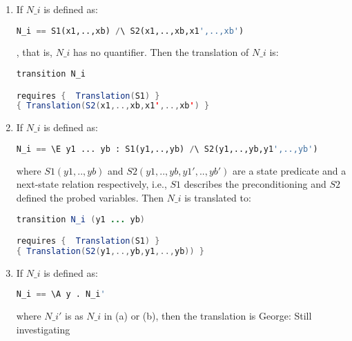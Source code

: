 \documentclass{article}
\theoremstyle{plain}
\numberwithin{equation}{section}
\newcommand {\A}{\mathbb A}
\begin{document}
\begin{enumerate}

\item If  $N\_i$ is defined as:

\begin{lstlisting}[language=Python]
N_i == S1(x1,..,xb) /\ S2(x1,..,xb,x1',..,xb')
\end{lstlisting}
, that is, $N\_i$ has no quantifier. Then the translation of  $N\_i$ is: 


\begin{lstlisting}[language=Java]
transition N_i 

requires {  Translation(S1) }
{ Translation(S2(x1,..,xb,x1',..,xb') }

\end{lstlisting}


\item If  $N\_i$ is defined as:

\begin{lstlisting}[language=Python]
N_i == \E y1 ... yb : S1(y1,..,yb) /\ S2(y1,..,yb,y1',..,yb')
\end{lstlisting}

where $S1(y1,..,yb)$  and $S2(y1,..,yb,y1',..,yb')$  are a state predicate and a next-state relation respectively, i.e., $S1$ describes the preconditioning and $S2$ defined the probed variables. Then  $N\_i$ is translated to: 

\begin{lstlisting}[language=Java]
transition N_i (y1 ... yb) 

requires {  Translation(S1) }
{ Translation(S2(y1,..,yb,y1,..,yb)) }

\end{lstlisting}

\item If  $N\_i$ is defined as:
\begin{lstlisting}[language=Python]
N_i == \A y . N_i' 
\end{lstlisting}
where $N\_i' $ is as $N\_i$  in (a) or (b), then the translation is 
\color{red} George: Still investigating \color{black}

 \end{enumerate}



\end{document}
